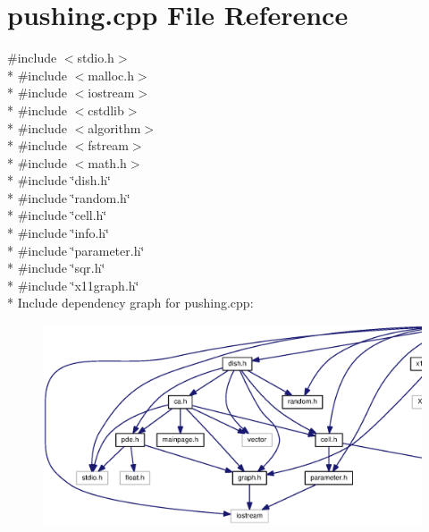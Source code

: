 \section{pushing.\-cpp File Reference}
\label{pushing_8cpp}
{\ttfamily \#include $<$stdio.\-h$>$}\\*
{\ttfamily \#include $<$malloc.\-h$>$}\\*
{\ttfamily \#include $<$iostream$>$}\\*
{\ttfamily \#include $<$cstdlib$>$}\\*
{\ttfamily \#include $<$algorithm$>$}\\*
{\ttfamily \#include $<$fstream$>$}\\*
{\ttfamily \#include $<$math.\-h$>$}\\*
{\ttfamily \#include \char`\"{}dish.\-h\char`\"{}}\\*
{\ttfamily \#include \char`\"{}random.\-h\char`\"{}}\\*
{\ttfamily \#include \char`\"{}cell.\-h\char`\"{}}\\*
{\ttfamily \#include \char`\"{}info.\-h\char`\"{}}\\*
{\ttfamily \#include \char`\"{}parameter.\-h\char`\"{}}\\*
{\ttfamily \#include \char`\"{}sqr.\-h\char`\"{}}\\*
{\ttfamily \#include \char`\"{}x11graph.\-h\char`\"{}}\\*
Include dependency graph for pushing.\-cpp\-:
\nopagebreak
\begin{figure}[H]
\begin{center}
\leavevmode
\includegraphics[width=350pt]{pushing_8cpp__incl}
\end{center}
\end{figure}
